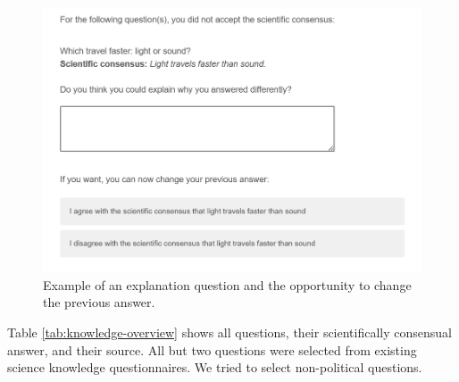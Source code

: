 \documentclass[
  doc,floatsintext]{apa6}
\begin{document}
\begin{figure}

{\centering \includegraphics[width=0.5\linewidth]{figures/study3_example_explanation} 

}

\caption{Example of an explanation question and the opportunity to change the previous answer.}\label{fig:exp3-explanation-example}
\end{figure}

Table \ref{tab:knowledge-overview} shows all questions, their scientifically consensual answer, and their source. All but two questions were selected from existing science knowledge questionnaires. We tried to select non-political questions.

\begingroup\fontsize{8}{10}\selectfont
\end{document}
